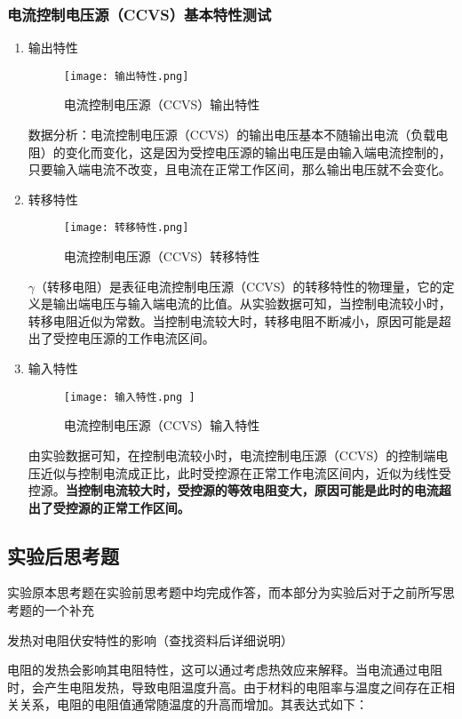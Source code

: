 \documentclass[dvipsnames, svgnames,a4paper,11pt]{article}
\begin{document}
		\subsubsection{电流控制电压源（CCVS）基本特性测试}
	\begin{enumerate}
			\begin{figure}[H]
			\centering
			\texttt{[image: 接线总览.jpg]}
			\caption{实验接线总览}
			\label{接线总览}
		\end{figure}
		\item 输出特性
		
		\begin{figure}[H]
			\centering
			\texttt{[image: 输出特性.png]}
			\caption{电流控制电压源（CCVS）输出特性}
			\label{输出特性}
		\end{figure}
		数据分析：电流控制电压源（CCVS）的输出电压基本不随输出电流（负载电阻）的变化而变化，这是因为受控电压源的输出电压是由输入端电流控制的，只要输入端电流不改变，且电流在正常工作区间，那么输出电压就不会变化。
		\item 转移特性
\begin{figure}[{H}]
	\centering
	\texttt{[image: 转移特性.png]}
	\caption{电流控制电压源（CCVS）转移特性}
	\label{}
\end{figure}		
$\gamma$（转移电阻）是表征电流控制电压源（CCVS）的转移特性的物理量，它的定义是输出端电压与输入端电流的比值。从实验数据可知，当控制电流较小时，转移电阻近似为常数。当控制电流较大时，转移电阻不断减小，原因可能是超出了受控电压源的工作电流区间。
\item 输入特性
 \begin{figure}[{H}]
	\centering
	\texttt{[image: 输入特性.png	]}
	\caption{电流控制电压源（CCVS）输入特性}
	\label{}
 \end{figure}
 由实验数据可知，在控制电流较小时，电流控制电压源（CCVS）的控制端电压近似与控制电流成正比，此时受控源在正常工作电流区间内，近似为线性受控源。\textbf{当控制电流较大时，受控源的等效电阻变大，原因可能是此时的电流超出了受控源的正常工作区间。}
	
	\end{enumerate}

	\subsection{实验后思考题}
	实验原本思考题在实验前思考题中均完成作答，而本部分为实验后对于之前所写思考题的一个补充
	\begin{question}
		发热对电阻伏安特性的影响（查找资料后详细说明）
	\end{question}
	电阻的发热会影响其电阻特性，这可以通过考虑热效应来解释。当电流通过电阻时，会产生电阻发热，导致电阻温度升高。由于材料的电阻率与温度之间存在正相关关系，电阻的电阻值通常随温度的升高而增加。其表达式如下：
\end{document}
